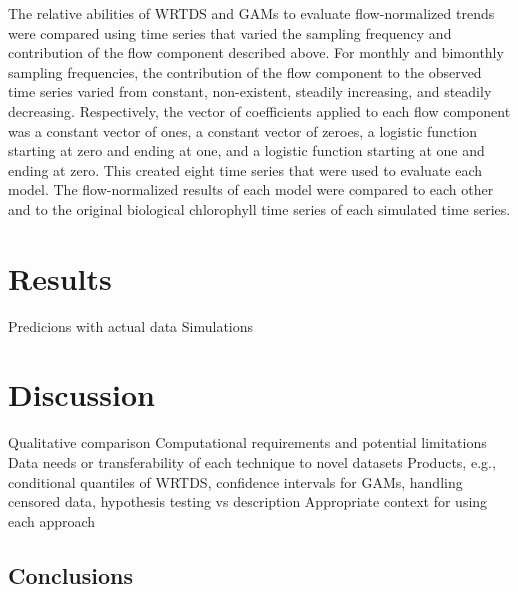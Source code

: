 \documentclass[letterpaper,12pt,oneside]{article}\usepackage[]{graphicx}\usepackage[]{color}
\begin{document}
The relative abilities of \ac{WRTDS} and \acp{GAM} to evaluate flow-normalized trends were compared using time series that varied the sampling frequency and contribution of the flow component described above.  For monthly and bimonthly sampling frequencies, the contribution of the flow component to the observed time series varied from constant, non-existent, steadily increasing, and steadily decreasing.  Respectively, the vector of coefficients applied to each flow component was a constant vector of ones, a constant vector of zeroes, a logistic function starting at zero and ending at one, and a logistic function starting at one and ending at zero.  This created eight time series that were used to evaluate each model.  The flow-normalized results of each model were compared to each other and to the original biological chlorophyll time series of each simulated time series.   

\section{Results}

\begin{outline}
\0 Predicions with actual data
\0 Simulations
\end{outline}

\section{Discussion}

\begin{outline}
\0 Qualitative comparison
\1 Computational requirements and potential limitations
\1 Data needs or transferability of each technique to novel datasets
\1 Products, e.g., conditional quantiles of \ac{WRTDS}, confidence intervals for \acp{GAM}, handling censored data, hypothesis testing vs description
\1 Appropriate context for using each approach
\end{outline}

\subsection{Conclusions}

\clearpage
\begin{singlespace}


\end{singlespace}
\clearpage


\end{document}
